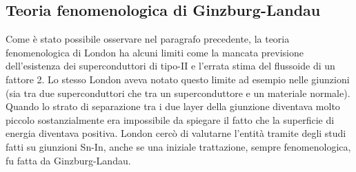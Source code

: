 \subsection{Teoria fenomenologica di Ginzburg-Landau}
Come \`e stato possibile osservare nel paragrafo precedente, la teoria fenomenologica di London ha alcuni limiti come la mancata previsione dell'esistenza dei superconduttori di tipo-II e l'errata stima del flussoide di un fattore 2. Lo stesso London aveva notato questo limite ad esempio nelle giunzioni (sia tra due superconduttori che tra un superconduttore e un materiale normale). Quando lo strato di separazione tra i due layer della giunzione diventava molto piccolo sostanzialmente era impossibile da spiegare il fatto che la superficie di energia diventava positiva. London cerc\`o di valutarne l'entit\`a tramite degli studi fatti su giunzioni Sn-In, anche se una iniziale trattazione, sempre fenomenologica, fu fatta da Ginzburg-Landau.
